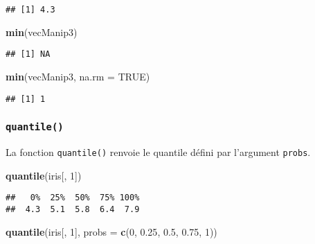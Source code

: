\documentclass[]{book}
\newenvironment{Shaded}{\begin{snugshade}}{\end{snugshade}}
\newcommand{\KeywordTok}[1]{\textcolor[rgb]{0.13,0.29,0.53}{\textbf{#1}}}
\newcommand{\DataTypeTok}[1]{\textcolor[rgb]{0.13,0.29,0.53}{#1}}
\newcommand{\DecValTok}[1]{\textcolor[rgb]{0.00,0.00,0.81}{#1}}
\newcommand{\FloatTok}[1]{\textcolor[rgb]{0.00,0.00,0.81}{#1}}
\newcommand{\OtherTok}[1]{\textcolor[rgb]{0.56,0.35,0.01}{#1}}
\newcommand{\NormalTok}[1]{#1}
\theoremstyle{definition}
\theoremstyle{definition}
\theoremstyle{definition}
\theoremstyle{remark}
\begin{document}
\begin{verbatim}
## [1] 4.3
\end{verbatim}

\begin{Shaded}
\begin{Highlighting}[]
\KeywordTok{min}\NormalTok{(vecManip3)}
\end{Highlighting}
\end{Shaded}

\begin{verbatim}
## [1] NA
\end{verbatim}

\begin{Shaded}
\begin{Highlighting}[]
\KeywordTok{min}\NormalTok{(vecManip3, }\DataTypeTok{na.rm =} \OtherTok{TRUE}\NormalTok{)}
\end{Highlighting}
\end{Shaded}

\begin{verbatim}
## [1] 1
\end{verbatim}

\subsubsection{\texorpdfstring{\texttt{quantile()}}{quantile()}}\label{l015quantile}

La fonction \texttt{quantile()} renvoie le quantile défini par
l'argument \texttt{probs}.

\begin{Shaded}
\begin{Highlighting}[]
\KeywordTok{quantile}\NormalTok{(iris[, }\DecValTok{1}\NormalTok{])}
\end{Highlighting}
\end{Shaded}

\begin{verbatim}
##   0%  25%  50%  75% 100% 
##  4.3  5.1  5.8  6.4  7.9
\end{verbatim}

\begin{Shaded}
\begin{Highlighting}[]
\KeywordTok{quantile}\NormalTok{(iris[, }\DecValTok{1}\NormalTok{], }\DataTypeTok{probs =} \KeywordTok{c}\NormalTok{(}\DecValTok{0}\NormalTok{, }\FloatTok{0.25}\NormalTok{, }\FloatTok{0.5}\NormalTok{, }\FloatTok{0.75}\NormalTok{, }\DecValTok{1}\NormalTok{))}
\end{Highlighting}
\end{Shaded}
\end{document}

